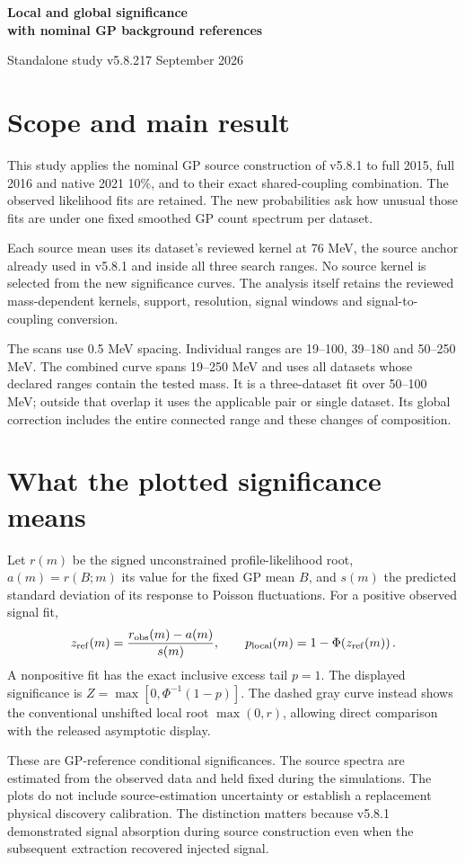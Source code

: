 \documentclass[11pt]{article}
\newcommand{\heading}[1]{\section*{\color{navy}#1}}
\begin{document}
{\LARGE\bfseries\color{navy} Local and global significance\\with nominal GP background references}\par
{\large Standalone study v5.8.2}\hfill 17 September 2026

\heading{Scope and main result}
This study applies the nominal GP source construction of v5.8.1 to full 2015, full 2016 and native 2021 10\%, and to their exact shared-coupling combination. The observed likelihood fits are retained. The new probabilities ask how unusual those fits are under one fixed smoothed GP count spectrum per dataset.

Each source mean uses its dataset's reviewed kernel at 76 MeV, the source anchor already used in v5.8.1 and inside all three search ranges. No source kernel is selected from the new significance curves. The analysis itself retains the reviewed mass-dependent kernels, support, resolution, signal windows and signal-to-coupling conversion.




The scans use 0.5 MeV spacing. Individual ranges are 19--100, 39--180 and 50--250 MeV. The combined curve spans 19--250 MeV and uses all datasets whose declared ranges contain the tested mass. It is a three-dataset fit over 50--100 MeV; outside that overlap it uses the applicable pair or single dataset. Its global correction includes the entire connected range and these changes of composition.

\heading{What the plotted significance means}
Let $r(m)$ be the signed unconstrained profile-likelihood root, $a(m)=r(B;m)$ its value for the fixed GP mean $B$, and $s(m)$ the predicted standard deviation of its response to Poisson fluctuations. For a positive observed signal fit,
\[
z_{\rm ref}(m)=\frac{r_{\rm obs}(m)-a(m)}{s(m)},\qquad
p_{\rm local}(m)=1-\Phi\!\left(z_{\rm ref}(m)\right).
\]
A nonpositive fit has the exact inclusive excess tail $p=1$. The displayed significance is $Z=\max[0,\Phi^{-1}(1-p)]$. The dashed gray curve instead shows the conventional unshifted local root $\max(0,r)$, allowing direct comparison with the released asymptotic display.

These are GP-reference conditional significances. The source spectra are estimated from the observed data and held fixed during the simulations. The plots do not include source-estimation uncertainty or establish a replacement physical discovery calibration. The distinction matters because v5.8.1 demonstrated signal absorption during source construction even when the subsequent extraction recovered injected signal.
\end{document}
